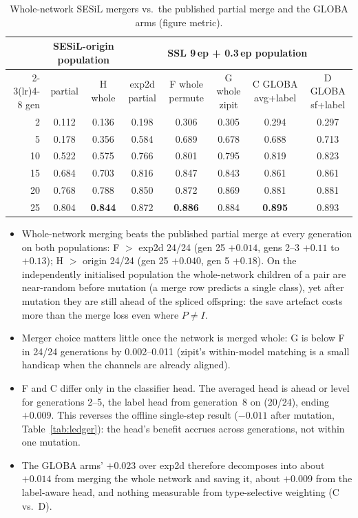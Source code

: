 \documentclass[11pt,a4paper]{article}
\begin{document}
\begin{table}[h]
\centering\small
\caption{Whole-network SESiL mergers vs.\ the published partial merge and the GLOBA arms (figure metric).}
\label{tab:wholenet}
\begin{tabular}{rccccccc}
\toprule
& \multicolumn{2}{c}{SESiL-origin population} & \multicolumn{5}{c}{SSL 9\,ep + 0.3\,ep population} \\
\cmidrule(lr){2-3}\cmidrule(lr){4-8}
gen & partial & H whole & exp2d partial & F whole permute & G whole zipit & C GLOBA avg+label & D GLOBA sf+label \\
\midrule
2  & 0.112 & 0.136 & 0.198 & 0.306 & 0.305 & 0.294 & 0.297 \\
5  & 0.178 & 0.356 & 0.584 & 0.689 & 0.678 & 0.688 & 0.713 \\
10 & 0.522 & 0.575 & 0.766 & 0.801 & 0.795 & 0.819 & 0.823 \\
15 & 0.684 & 0.703 & 0.816 & 0.847 & 0.843 & 0.861 & 0.861 \\
20 & 0.768 & 0.788 & 0.850 & 0.872 & 0.869 & 0.881 & 0.881 \\
25 & 0.804 & \textbf{0.844} & 0.872 & \textbf{0.886} & 0.884 & \textbf{0.895} & 0.893 \\
\bottomrule
\end{tabular}
\end{table}

\begin{itemize}[nosep]
\item Whole-network merging beats the published partial merge at every generation on both populations: F $>$ exp2d 24/24 (gen 25 $+0.014$, gens 2--3 $+0.11$ to $+0.13$); H $>$ origin 24/24 (gen 25 $+0.040$, gen 5 $+0.18$). On the independently initialised population the whole-network children of a pair are near-random before mutation (a merge row predicts a single class), yet after mutation they are still ahead of the spliced offspring: the save artefact costs more than the merge loss even where $P\neq I$.
\item Merger choice matters little once the network is merged whole: G is below F in 24/24 generations by 0.002--0.011 (zipit's within-model matching is a small handicap when the channels are already aligned).
\item F and C differ only in the classifier head. The averaged head is ahead or level for generations 2--5, the label head from generation~8 on (20/24), ending $+0.009$. This reverses the offline single-step result ($-0.011$ after mutation, Table~\ref{tab:ledger}): the head's benefit accrues across generations, not within one mutation.
\item The GLOBA arms' $+0.023$ over exp2d therefore decomposes into about $+0.014$ from merging the whole network and saving it, about $+0.009$ from the label-aware head, and nothing measurable from type-selective weighting (C vs.\ D).
\end{itemize}
\end{document}
